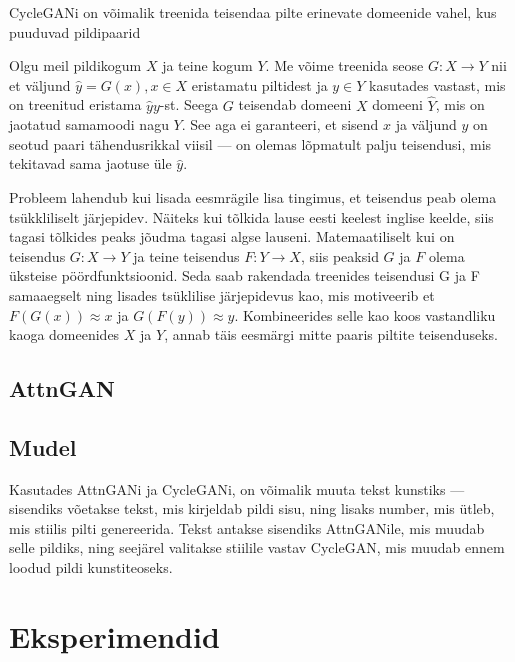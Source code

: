 \documentclass{vilgym}
\begin{document}
    
    CycleGANi on võimalik treenida teisendaa pilte erinevate domeenide vahel, kus puuduvad pildipaarid

    Olgu meil pildikogum $ X $ ja teine kogum $ Y $. Me võime treenida seose $ G: X \rightarrow Y $ nii et väljund $ \hat{y} = G(x), x \in X $ eristamatu piltidest ja $ y \in Y $ kasutades vastast, mis on treenitud eristama $ \hat{y} y $-st.
    Seega $ G $ teisendab domeeni $ X $ domeeni $ \hat{Y} $, mis on jaotatud samamoodi nagu $ Y $. See aga ei garanteeri, et sisend $ x $ ja väljund $ y $ on seotud paari tähendusrikkal viisil --- on olemas lõpmatult palju teisendusi, mis tekitavad sama jaotuse üle $ \hat{y} $.

    Probleem lahendub kui lisada eesmrägile lisa tingimus, et teisendus peab olema tsükkliliselt järjepidev. Näiteks kui tõlkida lause eesti keelest inglise keelde, siis tagasi tõlkides peaks jõudma tagasi algse lauseni. Matemaatiliselt kui on teisendus $ G: X \rightarrow Y $ ja teine teisendus $F: Y \rightarrow X $, siis peaksid $ G $ ja $ F $ olema üksteise pöördfunktsioonid.
    Seda saab rakendada treenides teisendusi G ja F samaaegselt ning lisades tsüklilise järjepidevus kao, mis motiveerib et $ F(G(x)) \approx x $ ja $ G(F(y)) \approx y $. Kombineerides selle kao koos vastandliku kaoga domeenides $ X $ ja $ Y $, annab täis eesmärgi mitte paaris piltite teisenduseks.

    \subsection{AttnGAN}
    \subsection{Mudel}
    Kasutades AttnGANi ja CycleGANi, on võimalik muuta tekst kunstiks --- sisendiks võetakse tekst, mis kirjeldab pildi sisu, ning lisaks number, mis ütleb, mis stiilis pilti genereerida. Tekst antakse sisendiks AttnGANile, mis muudab selle pildiks, ning seejärel valitakse stiilile vastav CycleGAN, mis muudab ennem loodud pildi kunstiteoseks.


    \section{Eksperimendid}


    \nocite{*} %
    \printbibliography[title={Kasutatud allikad}]
\end{document}
